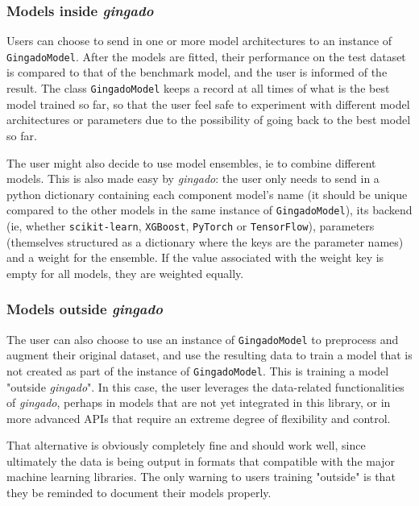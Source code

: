 \documentclass{article}
\begin{document}
\subsubsection{Models inside \textit{gingado}}

Users can choose to send in one or more model architectures to an instance of \texttt{GingadoModel}. After the models are fitted, their performance on the test dataset is compared to that of the benchmark model, and the user is informed of the result. The class \texttt{GingadoModel} keeps a record at all times of what is the best model trained so far, so that the user feel safe to experiment with different model architectures or parameters due to the possibility of going back to the best model so far.

The user might also decide to use model ensembles, ie to combine different models. This is also made easy by \textit{gingado}: the user only needs to send in a python dictionary containing each component model's name (it should be unique compared to the other models in the same instance of \texttt{GingadoModel}), its backend (ie, whether \texttt{scikit-learn}, \texttt{XGBoost}, \texttt{PyTorch} or \texttt{TensorFlow}), parameters (themselves structured as a dictionary where the keys are the parameter names) and a weight for the ensemble. If the value associated with the weight key is empty for all models, they are weighted equally.

\subsubsection{Models outside \textit{gingado}}\label{outside}

The user can also choose to use an instance of \texttt{GingadoModel} to preprocess and augment their original dataset, and use the resulting data to train a model that is not created as part of the instance of \texttt{GingadoModel}. This is training a model "outside \textit{gingado}". In this case, the user leverages the data-related functionalities of \textit{gingado}, perhaps in models that are not yet integrated in this library, or in more advanced APIs that require an extreme degree of flexibility and control.

That alternative is obviously completely fine and should work well, since ultimately the data is being output in formats that compatible with the major machine learning libraries. The only warning to users training "outside" is that they be reminded to document their models properly.
\end{document}
